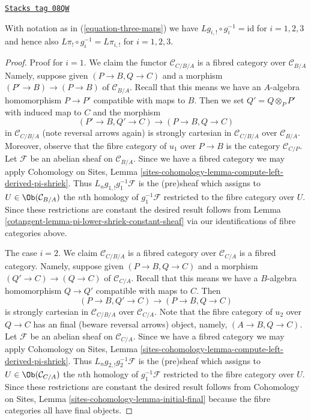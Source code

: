 \begin{lemma}
\label{cotangent-lemma-triangle-compute-lower-shriek}
\href{https://stacks.math.columbia.edu/tag/08QW}{\texttt{Stacks tag 08QW}}

With notation as in (\ref{equation-three-maps}) we have
$Lg_{i, !} \circ g_i^{-1} = \text{id}$ for $i = 1, 2, 3$
and hence also $L\pi_! \circ g_i^{-1} = L\pi_{i, !}$ for
$i = 1, 2, 3$.
\end{lemma}

\begin{proof}

Proof for $i = 1$. We claim the functor $\mathcal{C}_{C/B/A}$
is a fibred category over $\mathcal{C}_{B/A}$
Namely, suppose given $(P \to B, Q \to C)$
and a morphism $(P' \to B) \to (P \to B)$ of $\mathcal{C}_{B/A}$.
Recall that this means we have an $A$-algebra homomorphism
$P \to P'$ compatible with maps to $B$. Then we set $Q' = Q \otimes_P P'$
with induced map to $C$ and the morphism
$$
(P' \to B, Q' \to C) \longrightarrow (P \to B, Q \to C)
$$
in $\mathcal{C}_{C/B/A}$ (note reversal arrows again) is strongly cartesian
in $\mathcal{C}_{C/B/A}$ over $\mathcal{C}_{B/A}$. Moreover, observe
that the fibre category of $u_1$ over $P \to B$ is the category
$\mathcal{C}_{C/P}$. Let $\mathcal{F}$ be an abelian sheaf on
$\mathcal{C}_{B/A}$. Since we have a fibred category we may apply
Cohomology on Sites, Lemma
\ref{sites-cohomology-lemma-compute-left-derived-pi-shriek}.
Thus $L_ng_{1, !}g_1^{-1}\mathcal{F}$ is the (pre)sheaf
which assigns to $U \in \Ob(\mathcal{C}_{B/A})$ the $n$th homology of
$g_1^{-1}\mathcal{F}$ restricted to the fibre category over $U$.
Since these restrictions are constant the desired result follows from
Lemma \ref{cotangent-lemma-pi-lower-shriek-constant-sheaf}
via our identifications of fibre categories above.

\medskip\noindent
The case $i = 2$.
We claim $\mathcal{C}_{C/B/A}$ is a fibred category over $\mathcal{C}_{C/A}$
is a fibred category. Namely, suppose given $(P \to B, Q \to C)$
and a morphism $(Q' \to C) \to (Q \to C)$ of $\mathcal{C}_{C/A}$.
Recall that this means we have a $B$-algebra homomorphism
$Q \to Q'$ compatible with maps to $C$. Then
$$
(P \to B, Q' \to C) \longrightarrow (P \to B, Q \to C)
$$
is strongly cartesian in $\mathcal{C}_{C/B/A}$ over $\mathcal{C}_{C/A}$.
Note that the fibre category of $u_2$ over $Q \to C$ has an final
(beware reversal arrows) object, namely, $(A \to B, Q \to C)$. Let
$\mathcal{F}$ be an abelian sheaf on $\mathcal{C}_{C/A}$.
Since we have a fibred category we may apply
Cohomology on Sites, Lemma
\ref{sites-cohomology-lemma-compute-left-derived-pi-shriek}.
Thus $L_ng_{2, !}g_2^{-1}\mathcal{F}$ is the (pre)sheaf
which assigns to $U \in \Ob(\mathcal{C}_{C/A})$ the $n$th homology of
$g_1^{-1}\mathcal{F}$ restricted to the fibre category over $U$.
Since these restrictions are constant the desired result follows from
Cohomology on Sites, Lemma \ref{sites-cohomology-lemma-initial-final}
because the fibre categories all have final objects.


\end{proof}
